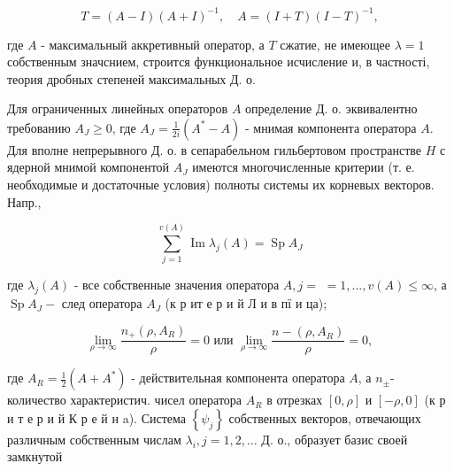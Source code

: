\documentclass[10pt]{article}
\begin{document}
\[

T=(A-I)(A+I)^{-1}, \quad A=(I+T)(I-T)^{-1},

\]



где $A$ - максимальный аккретивный оператор, а $T$ сжатие, не имеющее $\lambda=1$ собственным значснием, строится функциональное исчисление и, в частності, теория дробных степеней максимальных Д. о.



Для ограниченных линейных операторов $A$ определение Д. о. эквивалентно требованию $A_{J} \geqslant 0$, где $A_{J}=\frac{1}{2 i}\left(A^{*}-A\right)$ - мнимая компонента оператора $A$. Для вполне непрерывного Д. о. в сепарабельном гильбертовом пространстве $H$ с ядерной мнимой компонентой $A_{J}$ имеются многочисленные критерии (т. е. необходимые и достаточные условия) полноты системы их корневых векторов. Напр.,



\[

\sum_{j=1}^{v(A)} \operatorname{Im} \lambda_{j}(A)=\operatorname{Sp} A_{J}

\]



где $\lambda_{j}(A)$ - все собственные значения оператора $A, j=$ $=1, \ldots, v(A) \leqslant \infty$, а $\operatorname{Sp} A_{J}-$ след оператора $A_{J}$ (к р ит е р и й Л и в пї и ца);



\[

\lim _{\rho \rightarrow \infty} \frac{n_{+}\left(\rho, A_{R}\right)}{\rho}=0 \text { или } \lim _{\rho \rightarrow \infty} \frac{n-\left(\rho, A_{R}\right)}{\rho}=0,

\]



где $A_{R}=\frac{1}{2}\left(A+A^{*}\right)$ - действительная компонента оператора $A$, а $n_{ \pm}$- количество характеристич. чисел оператора $A_{R}$ в отрезках $[0, \rho]$ и $[-\rho, 0]$ (к р и т е р и й К р е й н a). Система $\left\{\psi_{j}\right\}$ собственных векторов, отвечающих различным собственным числам $\lambda_{i}, j=1,2, \ldots$ Д. о., образует базис своей замкнутой
\end{document}
